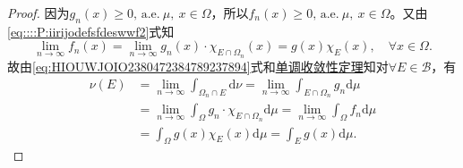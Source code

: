 \documentclass[../../main.tex]{subfiles}%
\begin{document}
\begin{proof}
因为$g_n\left( x \right) \geqslant 0,\,\mathrm{a}.\mathrm{e}.\ \mu,\ x\in \Omega$，所以$f_n\left( x \right) \geqslant 0,\,\mathrm{a}.\mathrm{e}.\ \mu,\ x\in \Omega$。又由\eqref{eq::::P:iirijodefsfdeswwf2}式知
$$\lim\limits_{n\rightarrow \infty}f_n\left( x \right) =\lim\limits_{n\rightarrow \infty}g_n\left( x \right) \cdot \chi _{E\cap \Omega _n}\left( x \right) =g\left( x \right) \chi _E\left( x \right),\quad \forall x\in \Omega.$$
故由\eqref{eq:HIOUWJOIO2380472384789237894}式和\hyperref[Real Analysis-theorem:Beppo Levi非负渐升列积分定理]{单调收敛性定理}知对$\forall E\in \mathcal{B}$，有
\begin{align*}
\nu (E)&=\lim\limits_{n\rightarrow \infty} \int_{\Omega _n\cap E}{\mathrm{d}\nu}=\lim\limits_{n\rightarrow \infty} \int_{E\cap \Omega _n}{g_n\mathrm{d}\mu} \nonumber\\
&=\lim\limits_{n\rightarrow \infty} \int_{\Omega}{g_n\cdot \chi _{E\cap \Omega _n}\mathrm{d}\mu}=\lim\limits_{n\rightarrow \infty} \int_{\Omega}{f_n\mathrm{d}\mu} \nonumber\\
&=\int_{\Omega}{g\left( x \right) \chi _E\left( x \right) \mathrm{d}\mu}=\int_E{g\left( x \right) \mathrm{d}\mu}.
\end{align*}
\end{proof}
\end{document}

